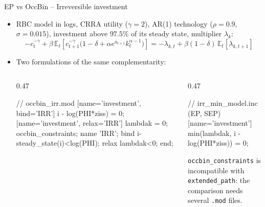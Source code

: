\documentclass[11pt,aspectratio=169]{beamer}
\newcommand{\E}{\mathbb{E}}
\newcommand{\code}[1]{\texttt{#1}}
\begin{document}
\begin{frame}[fragile]{EP vs OccBin -- Irreversible investment}

\begin{itemize}

\item RBC model in logs, CRRA utility ($\gamma=2$), AR(1) technology ($\rho=0.9$, $\sigma=0.015$), investment above $97.5\%$ of its steady state, multiplier $\lambda_k$:
  \[
  -c_t^{-\gamma} + \beta\,\E_t\!\left[c_{t+1}^{-\gamma}\big(1-\delta+\alpha e^{a_{t+1}}k_t^{\alpha-1}\big)\right] = -\lambda_{k,t} + \beta(1-\delta)\,\E_t[\lambda_{k,t+1}]
  \]

\item Two formulations of the same complementarity:
\begin{columns}[T]
\begin{column}{0.47\textwidth}
\begin{semiverbatim}\scriptsize
// occbin_irr.mod
[name='investment', bind='IRR']
i - log(PHI*ziss) = 0;
[name='investment', relax='IRR']
lambdak = 0;
occbin_constraints;
  name 'IRR';
  bind i-steady_state(i)<log(PHI);
  relax lambdak<0;
end;
\end{semiverbatim}
\end{column}
\begin{column}{0.47\textwidth}
\begin{semiverbatim}\scriptsize
// irr_min_model.inc (EP, SEP)
[name='investment']
min(lambdak, i - log(PHI*ziss)) = 0;
\end{semiverbatim}
\vspace*{0.3cm}
\scriptsize \code{occbin\_constraints} is incompatible with \code{extended\_path}: the comparison needs several \code{.mod} files.
\end{column}
\end{columns}

\end{itemize}

\end{frame}
\end{document}

